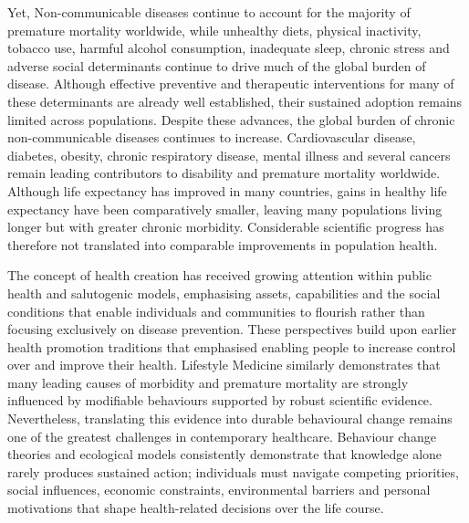 \documentclass{article}
\begin{document}
Yet, Non-communicable diseases continue to account for the majority of premature mortality worldwide, while unhealthy diets, physical inactivity, tobacco use, harmful alcohol consumption, inadequate sleep, chronic stress and adverse social determinants continue to drive much of the global burden of disease. Although effective preventive and therapeutic interventions for many of these determinants are already well established, their sustained adoption remains limited across populations. Despite these advances, the global burden of chronic non-communicable diseases continues to increase. Cardiovascular disease, diabetes, obesity, chronic respiratory disease, mental illness and several cancers remain leading contributors to disability and premature mortality worldwide. Although life expectancy has improved in many countries, gains in healthy life expectancy have been comparatively smaller, leaving many populations living longer but with greater chronic morbidity. Considerable scientific progress has therefore not translated into comparable improvements in population health.

The concept of health creation has received growing attention within public health and salutogenic models, emphasising assets, capabilities and the social conditions that enable individuals and communities to flourish rather than focusing exclusively on disease prevention.  These perspectives build upon earlier health promotion traditions that emphasised enabling people to increase control over and improve their health. Lifestyle Medicine similarly demonstrates that many leading causes of morbidity and premature mortality are strongly influenced by modifiable behaviours supported by robust scientific evidence. Nevertheless, translating this evidence into durable behavioural change remains one of the greatest challenges in contemporary healthcare. Behaviour change theories and ecological models consistently demonstrate that knowledge alone rarely produces sustained action; individuals must navigate competing priorities, social influences, economic constraints, environmental barriers and personal motivations that shape health-related decisions over the life course.
\end{document}
